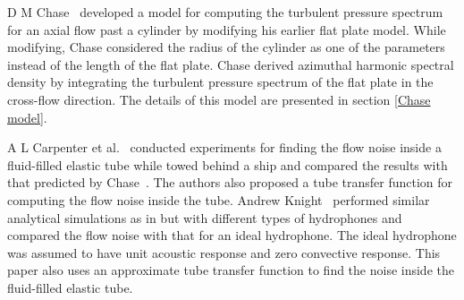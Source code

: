 \documentclass[twocolumn,10pt]{asme2ej}
\begin{document}



D M Chase~\cite{Chase1981} developed a model for computing the turbulent pressure spectrum for an axial flow past a cylinder by modifying his earlier flat plate model. While modifying, Chase considered the radius of the cylinder as one of the parameters instead of the length of the flat plate. Chase derived azimuthal harmonic spectral density by integrating the turbulent pressure spectrum of the flat plate in the cross-flow direction. The details of this model are presented in section \ref{Chase model}. 


A L Carpenter et al.~\cite{carpenter1983} conducted experiments for finding the flow noise inside a fluid-filled elastic tube while towed behind a ship and compared the results with that predicted by  Chase~\cite{Chase1981}. The authors also proposed a tube transfer function for computing the flow noise inside the tube. Andrew Knight~\cite{knight1996} performed similar analytical simulations as in \cite{carpenter1983} but with different types of hydrophones and compared the flow noise with that for an ideal hydrophone. The ideal hydrophone was assumed to have unit acoustic response and zero convective response. This paper also uses an approximate tube transfer function to find the noise inside the fluid-filled elastic tube.\par
\end{document}
